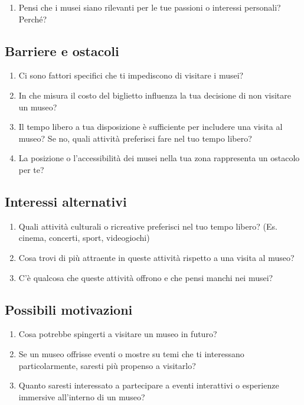 \documentclass[a4paper, 12pt]{article}
\begin{document}
\begin{enumerate}
    \item Pensi che i musei siano rilevanti per le tue passioni o interessi personali? Perché?
\end{enumerate}

\subsection{\textcolor{subsectioncolor}{Barriere e ostacoli}}

\begin{enumerate}
    \item Ci sono fattori specifici che ti impediscono di visitare i musei?
    \item In che misura il costo del biglietto influenza la tua decisione di non visitare un museo?
    \item Il tempo libero a tua disposizione è sufficiente per includere una visita al museo? Se no, quali attività preferisci fare nel tuo tempo libero?
    \item La posizione o l'accessibilità dei musei nella tua zona rappresenta un ostacolo per te?
\end{enumerate}

\subsection{\textcolor{subsectioncolor}{Interessi alternativi}}

\begin{enumerate}
    \item Quali attività culturali o ricreative preferisci nel tuo tempo libero? (Es. cinema, concerti, sport, videogiochi)
    \item Cosa trovi di più attraente in queste attività rispetto a una visita al museo?
    \item C'è qualcosa che queste attività offrono e che pensi manchi nei musei?
\end{enumerate}

\subsection{\textcolor{subsectioncolor}{Possibili motivazioni}}

\begin{enumerate}
    \item Cosa potrebbe spingerti a visitare un museo in futuro?
    \item Se un museo offrisse eventi o mostre su temi che ti interessano particolarmente, saresti più propenso a visitarlo?
    \item Quanto saresti interessato a partecipare a eventi interattivi o esperienze immersive all'interno di un museo?
\end{enumerate}
\end{document}

